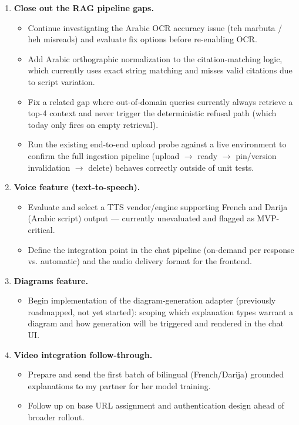 \documentclass[11pt]{article}
\begin{document}
\begin{enumerate}
    \item \textbf{Close out the RAG pipeline gaps.}
    \begin{itemize}
        \item Continue investigating the Arabic OCR accuracy issue (teh marbuta / heh misreads) and evaluate fix options before re-enabling OCR.
        \item Add Arabic orthographic normalization to the citation-matching logic, which currently uses exact string matching and misses valid citations due to script variation.
        \item Fix a related gap where out-of-domain queries currently always retrieve a top-4 context and never trigger the deterministic refusal path (which today only fires on empty retrieval).
        \item Run the existing end-to-end upload probe against a live environment to confirm the full ingestion pipeline (upload $\rightarrow$ ready $\rightarrow$ pin/version invalidation $\rightarrow$ delete) behaves correctly outside of unit tests.
    \end{itemize}
    \item \textbf{Voice feature (text-to-speech).}
    \begin{itemize}
        \item Evaluate and select a TTS vendor/engine supporting French and Darija (Arabic script) output --- currently unevaluated and flagged as MVP-critical.
        \item Define the integration point in the chat pipeline (on-demand per response vs. automatic) and the audio delivery format for the frontend.
    \end{itemize}
    \item \textbf{Diagrams feature.}
    \begin{itemize}
        \item Begin implementation of the diagram-generation adapter (previously roadmapped, not yet started): scoping which explanation types warrant a diagram and how generation will be triggered and rendered in the chat UI.
    \end{itemize}
    \item \textbf{Video integration follow-through.}
    \begin{itemize}
        \item Prepare and send the first batch of bilingual (French/Darija) grounded explanations to my partner for her model training.
        \item Follow up on base URL assignment and authentication design ahead of broader rollout.
    \end{itemize}
\end{enumerate}
\end{document}
